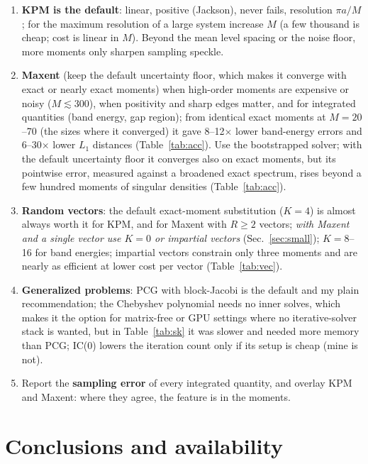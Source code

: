 \documentclass[reprint,nofootinbib,superscriptaddress,amsmath,amssymb,aps,prb,floatfix]{revtex4-2}
\begin{document}
\begin{enumerate}
\item \textbf{KPM is the default}: linear, positive (Jackson), never fails, resolution $\pi a/M$; for the maximum resolution of a large system increase $M$ (a few thousand is cheap; cost is linear in $M$).
Beyond the mean level spacing or the noise floor, more moments only sharpen sampling speckle.
\item \textbf{Maxent} (keep the default uncertainty floor, which makes it converge with exact or nearly exact moments) when high-order moments are expensive or noisy ($M\lesssim300$), when positivity and sharp edges matter, and for integrated quantities (band energy, gap region); from identical exact moments at $M=20$--70 (the sizes where it converged) it gave 8--12$\times$ lower band-energy errors and 6--30$\times$ lower $L_1$ distances (Table~\ref{tab:acc}).
Use the bootstrapped solver; with the default uncertainty floor it converges also on exact moments, but its pointwise error, measured against a broadened exact spectrum, rises beyond a few hundred moments of singular densities (Table~\ref{tab:acc}).
\item \textbf{Random vectors}: the default exact-moment substitution ($K=4$) is almost always worth it for KPM, and for Maxent with $R\ge2$ vectors; \emph{with Maxent and a single vector use $K=0$ or impartial vectors} (Sec.~\ref{sec:small}); $K=8$--16 for band energies; impartial vectors constrain only three moments and are nearly as efficient at lower cost per vector (Table~\ref{tab:vec}).
\item \textbf{Generalized problems}: PCG with block-Jacobi is the default and my plain recommendation; the Chebyshev polynomial needs no inner solves, which makes it the option for matrix-free or GPU settings where no iterative-solver stack is wanted, but in Table~\ref{tab:sk} it was slower and needed more memory than PCG; IC(0) lowers the iteration count only if its setup is cheap (mine is not).
\item Report the \textbf{sampling error} of every integrated quantity, and overlay KPM and Maxent: where they agree, the feature is in the moments.
\end{enumerate}

\section{Conclusions and availability}
\label{sec:conc}
\end{document}
